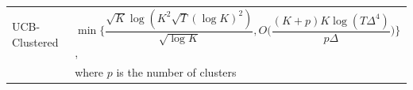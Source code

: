 \begin{center}
\begin{tabular}{ll}
UCB-Clustered             &\hspace*{5em}$\min\bigg\lbrace\dfrac{\sqrt{K}\log{(K^{2}\sqrt{T}(\log K)^{2})}}{\sqrt{\log K}},O\bigg(\dfrac{(K+p)K\log (T\Delta^{4})}{p\Delta}\bigg)\bigg\rbrace$, \\& \hspace*{5em} where $p$ is the number of clusters \\
\end{tabular}
\end{center}


